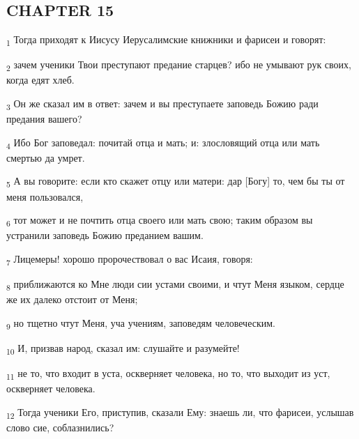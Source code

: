 \subsection{CHAPTER 15}
\begin{tcolorbox}
\textsubscript{1} Тогда приходят к Иисусу Иерусалимские книжники и фарисеи и говорят:
\end{tcolorbox}
\begin{tcolorbox}
\textsubscript{2} зачем ученики Твои преступают предание старцев? ибо не умывают рук своих, когда едят хлеб.
\end{tcolorbox}
\begin{tcolorbox}
\textsubscript{3} Он же сказал им в ответ: зачем и вы преступаете заповедь Божию ради предания вашего?
\end{tcolorbox}
\begin{tcolorbox}
\textsubscript{4} Ибо Бог заповедал: почитай отца и мать; и: злословящий отца или мать смертью да умрет.
\end{tcolorbox}
\begin{tcolorbox}
\textsubscript{5} А вы говорите: если кто скажет отцу или матери: дар [Богу] то, чем бы ты от меня пользовался,
\end{tcolorbox}
\begin{tcolorbox}
\textsubscript{6} тот может и не почтить отца своего или мать свою; таким образом вы устранили заповедь Божию преданием вашим.
\end{tcolorbox}
\begin{tcolorbox}
\textsubscript{7} Лицемеры! хорошо пророчествовал о вас Исаия, говоря:
\end{tcolorbox}
\begin{tcolorbox}
\textsubscript{8} приближаются ко Мне люди сии устами своими, и чтут Меня языком, сердце же их далеко отстоит от Меня;
\end{tcolorbox}
\begin{tcolorbox}
\textsubscript{9} но тщетно чтут Меня, уча учениям, заповедям человеческим.
\end{tcolorbox}
\begin{tcolorbox}
\textsubscript{10} И, призвав народ, сказал им: слушайте и разумейте!
\end{tcolorbox}
\begin{tcolorbox}
\textsubscript{11} не то, что входит в уста, оскверняет человека, но то, что выходит из уст, оскверняет человека.
\end{tcolorbox}
\begin{tcolorbox}
\textsubscript{12} Тогда ученики Его, приступив, сказали Ему: знаешь ли, что фарисеи, услышав слово сие, соблазнились?
\end{tcolorbox}
